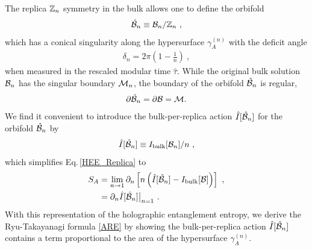 The replica $\mathbb{Z}_n$ symmetry in the bulk allows one to define the orbifold
\begin{align}
	\hat {{\cal B}}_n \equiv {\cal B}_n / \mathbb{Z}_n \ ,
\end{align}
which has a conical singularity along the hypersurface $\gamma_A^{(n)}$ with the deficit angle
\begin{align}
	\delta_n  = 2\pi \left(1-\frac{1}{n}\right) \ ,
\end{align}
when measured in the rescaled modular time $\hat \tau$.
While the original bulk solution ${\cal B}_n$ has the singular boundary ${\cal M}_n$,
the boundary of the orbifold $\hat {{\cal B}}_n$ is regular,
\begin{align}
	\partial \hat {{\cal B}}_n = \partial {\cal B} = {\cal M} .
\end{align}
We find it convenient to introduce the bulk-per-replica action $\hat I [\hat {{\cal B}}_n]$ for the orbifold $\hat {{\cal B}}_n$ by 
\begin{align}\label{Bulk_Per_Replica}
	\hat I [\hat {{\cal B}}_n] \equiv I_\text{bulk}[{\cal B}_n]/n \ ,
\end{align}
which simplifies Eq.\,\eqref{HEE_Replica} to
\begin{align}\label{ARE_II}
\begin{aligned}
	S_A &= \lim_{n\to 1} \partial_n \left[ n \left( \hat I [\hat {{\cal B}}_n] - I_\text{bulk} [{\cal B}]\right) \right] \ ,\\
	&= \partial_n \hat I [\hat {{\cal B}}_n]\big|_{n=1}\ .
\end{aligned}
\end{align}
With this representation of the holographic entanglement entropy, 
we derive the Ryu-Takayanagi formula \eqref{ARE} by showing the bulk-per-replica action $\hat I [\hat {{\cal B}}_n]$ contains a term proportional to the area of the hypersurface $\gamma_A^{(n)}$.

